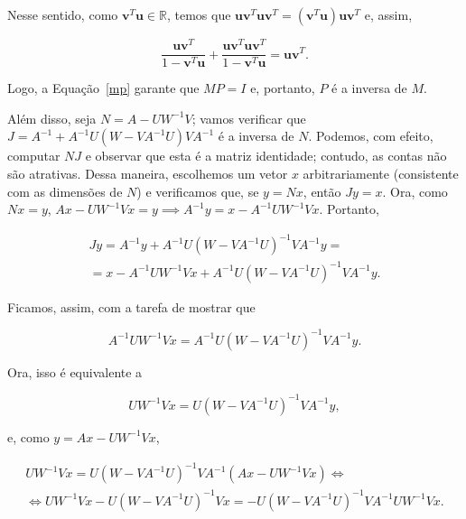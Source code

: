\documentclass[leqno]{article}
\begin{document}
\begin{enumerate}
\begin{sol}
	\noindent Nesse sentido, como $\mathbf{v}^T\mathbf{u} \in \mathbb{R}$, temos que $\mathbf{u}\mathbf{v}^T\mathbf{u}\mathbf{v}^T = (\mathbf{v}^T\mathbf{u})\mathbf{u}\mathbf{v}^T$ e, assim, 

	\begin{equation*} 
		\frac{\mathbf{u}\mathbf{v}^T}{1 - \mathbf{v}^T\mathbf{u}} + \frac{\mathbf{u}\mathbf{v}^T\mathbf{u}\mathbf{v}^T}{1 - \mathbf{v}^T\mathbf{u}} = \mathbf{u}\mathbf{v}^T. 
	\end{equation*} 

	\noindent Logo, a Equação~\eqref{mp} garante que $MP = I$ e, portanto, $P$ é a inversa de $M$. 

	Além disso, seja $N = A - U W^{-1}V$; vamos verificar que $J = A^{-1} + A^{-1}U(W - VA^{-1}U)VA^{-1}$ é a inversa de $N$. Podemos, com efeito, computar $NJ$ e observar que esta é a matriz identidade; contudo, as contas não são atrativas. Dessa maneira, escolhemos um vetor $x$ arbitrariamente (consistente com as dimensões de $N$) e verificamos que, se $y = Nx$, então $Jy = x$. Ora, como $Nx = y$, $Ax - UW^{-1}Vx = y \implies A^{-1}y = x - A^{-1}UW^{-1}Vx$. Portanto, 
	
	\begin{equation*} 
		\begin{split} 
			Jy = A^{-1}y + A^{-1}U(W - VA^{-1}U)^{-1}VA^{-1}y = \\ 
			= x - A^{-1}UW^{-1}Vx + A^{-1}U(W - VA^{-1}U)^{-1}VA^{-1}y.   
		\end{split} 
	\end{equation*} 

	\noindent Ficamos, assim, com a tarefa de mostrar que 

	\begin{equation*} 
		A^{-1}UW^{-1}Vx = A^{-1}U(W - VA^{-1}U)^{-1}VA^{-1}y.   
	\end{equation*} 

	\noindent Ora, isso é equivalente a 

	\begin{equation*} 
		UW^{-1}Vx = U(W - VA^{-1}U)^{-1}VA^{-1}y,   
	\end{equation*} 

	\noindent e, como $y = Ax - UW^{-1}Vx$, 

	\begin{equation*} 
		\begin{split} 
			UW^{-1}Vx = U(W - VA^{-1}U)^{-1}VA^{-1}(Ax - UW^{-1}Vx) \iff \\ 
			\iff UW^{-1}Vx - U(W - VA^{-1}U)^{-1}Vx = -U(W - VA^{-1}U)^{-1}VA^{-1}UW^{-1}Vx. 
		\end{split} 
	\end{equation*} 


\end{sol}
\end{enumerate}
\end{document}
